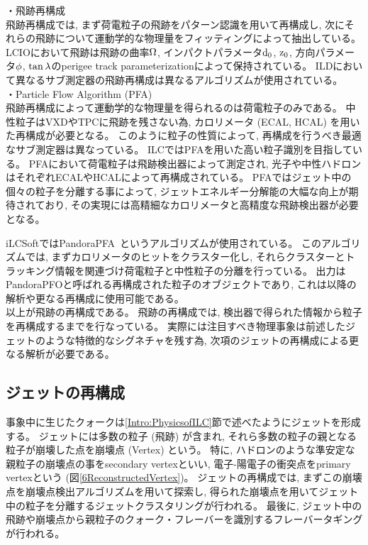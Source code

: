 ・飛跡再構成\\

飛跡再構成では, まず荷電粒子の飛跡をパターン認識を用いて再構成し, 次にそれらの飛跡について運動学的な物理量をフィッティングによって抽出している。
LCIOにおいて飛跡は飛跡の曲率$\rm \Omega$, インパクトパラメータ$\rm d_0$, $\rm z_0$, 方向パラメータ$\rm \phi$, $\rm \tan{\lambda}$のperigee track parameterizationによって保持されている。
ILDにおいて異なるサブ測定器の飛跡再構成は異なるアルゴリズムが使用されている。\\

・Particle Flow Algorithm (PFA)\\

飛跡再構成によって運動学的な物理量を得られるのは荷電粒子のみである。
中性粒子はVXDやTPCに飛跡を残さない為, カロリメータ (ECAL, HCAL) を用いた再構成が必要となる。
このように粒子の性質によって, 再構成を行うべき最適なサブ測定器は異なっている。
ILCではPFAを用いた高い粒子識別を目指している。
PFAにおいて荷電粒子は飛跡検出器によって測定され, 光子や中性ハドロンはそれぞれECALやHCALによって再構成されている。
PFAではジェット中の個々の粒子を分離する事によって, ジェットエネルギー分解能の大幅な向上が期待されており, その実現には高精細なカロリメータと高精度な飛跡検出器が必要となる。

iLCSoftではPandoraPFA~\cite{PandoraPFA}というアルゴリズムが使用されている。
このアルゴリズムでは, まずカロリメータのヒットをクラスター化し, それらクラスターとトラッキング情報を関連づけ荷電粒子と中性粒子の分離を行っている。
出力はPandoraPFOと呼ばれる再構成された粒子のオブジェクトであり, これは以降の解析や更なる再構成に使用可能である。\\

以上が飛跡の再構成である。
飛跡の再構成では, 検出器で得られた情報から粒子を再構成するまでを行なっている。
実際には注目すべき物理事象は前述したジェットのような特徴的なシグネチャを残す為, 次項のジェットの再構成による更なる解析が必要である。

\newpage
\subsection{ジェットの再構成} \label{Intro:SoftERILC:JetReconstruction}

事象中に生じたクォークは\ref{Intro:PhysicsofILC}節で述べたようにジェットを形成する。
ジェットには多数の粒子 (飛跡) が含まれ, それら多数の粒子の親となる粒子が崩壊した点を崩壊点 (Vertex) という。
特に, ハドロンのような準安定な親粒子の崩壊点の事をsecondary vertexといい, 電子-陽電子の衝突点をprimary vertexという (図\ref{6ReconstructedVertex})。
ジェットの再構成では, まずこの崩壊点を崩壊点検出アルゴリズムを用いて探索し, 得られた崩壊点を用いてジェット中の粒子を分離するジェットクラスタリングが行われる。
最後に, ジェット中の飛跡や崩壊点から親粒子のクォーク・フレーバーを識別するフレーバータギングが行われる。

